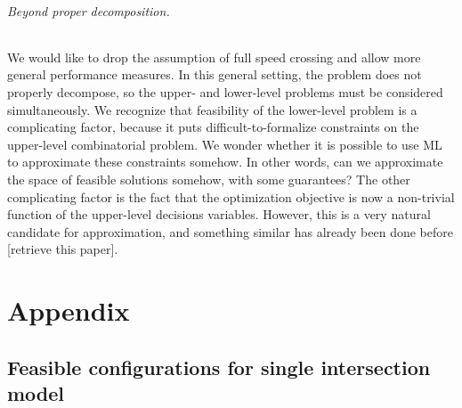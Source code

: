 \documentclass[a4paper]{report}
\theoremstyle{definition}
\theoremstyle{plain}
\newcommand\note[1]{{\color{Navy}#1}}
\begin{document}
\paragraph{Beyond proper decomposition.}

We would like to drop the assumption of full speed crossing and allow more
general performance measures.
%
In this general setting, the problem does not properly decompose, so the upper-
and lower-level problems must be considered simultaneously.
%
We recognize that feasibility of the lower-level problem is a complicating
factor, because it puts difficult-to-formalize constraints on the upper-level
combinatorial problem.
%
We wonder whether it is possible to use ML to approximate these constraints
somehow. In other words, can we approximate the space of feasible solutions
somehow, with some guarantees?
%
The other complicating factor is the fact that the optimization objective is now a non-trivial function of the upper-level decisions variables.
%
However, this is a very natural candidate for approximation, and something similar has already been done before \note{[retrieve this paper]}.


\begin{singlespacing}\raggedright

\label{sec:references}
\end{singlespacing}


\appendix

\let\origthechapter\thechapter
\makeatletter
\xpatchcmd{\addcontentsline}{%
\Hy@writebookmark{\csname the#2\endcsname}%
      {#3}%
      {\@currentHref}%
      {\Hy@toclevel}%
      {#1}%
}{%
\begingroup
\renewcommand{\thechapter}{\origthechapter.}
\Hy@writebookmark{\csname the#2\endcsname}%
{#3}%
{\@currentHref}%
{\Hy@toclevel}%
{#1}%
\endgroup
}{\typeout{Success}}{}
\makeatother


\part*{Appendix}

\chapter{Feasible configurations for single intersection model}\label{app:configuration-space}
\end{document}
